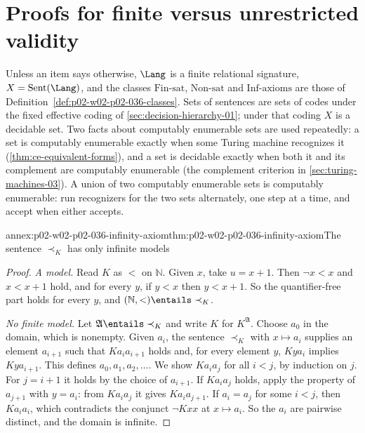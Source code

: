 \section{Proofs for finite versus unrestricted validity}
\label{sec:annex-p02-w02-p02-036-finite-validity}

Unless an item says otherwise, \(\Lang\) is a finite relational signature,
\(X=\operatorname{Sent}(\Lang)\), and the classes
\(\mathrm{Fin\text{-}sat}\), \(\mathrm{Non\text{-}sat}\) and
\(\mathrm{Inf\text{-}axioms}\) are those of
Definition~\ref{def:p02-w02-p02-036-classes}.  Sets of sentences are sets of
codes under the fixed effective coding of \cref{sec:decision-hierarchy-01};
under that coding \(X\) is a decidable set.  Two facts about computably
enumerable sets are used repeatedly: a set is computably enumerable exactly
when some Turing machine recognizes it (\cref{thm:ce-equivalent-forms}), and a
set is decidable exactly when both it and its complement are computably
enumerable (the complement criterion in \cref{sec:turing-machines-03}).  A
union of two computably enumerable sets is computably enumerable: run
recognizers for the two sets alternately, one step at a time, and accept when
either accepts.

\begin{annexitem}{annex:p02-w02-p02-036-infinity-axiom}{thm:p02-w02-p02-036-infinity-axiom}{The sentence \(\prec_K\) has only infinite models}
\begin{proof}
\emph{A model.}  Read \(K\) as \(<\) on \(\mathbb N\).  Given \(x\), take
\(u=x+1\).  Then \(\neg x<x\) and \(x<x+1\) hold, and for every \(y\), if
\(y<x\) then \(y<x+1\).  So the quantifier-free part holds for every \(y\),
and \((\mathbb N,<)\entails\prec_K\).

\emph{No finite model.}  Let \(\mathfrak A\entails\prec_K\) and write \(K\) for
\(K^{\mathfrak A}\).  Choose \(a_0\) in the domain, which is nonempty.  Given
\(a_i\), the sentence \(\prec_K\) with \(x\mapsto a_i\) supplies an element
\(a_{i+1}\) such that \(Ka_ia_{i+1}\) holds and, for every element \(y\),
\(Kya_i\) implies \(Kya_{i+1}\).  This defines \(a_0,a_1,a_2,\ldots\).  We show
\(Ka_ia_j\) for all \(i<j\), by induction on \(j\).  For \(j=i+1\) it holds by
the choice of \(a_{i+1}\).  If \(Ka_ia_j\) holds, apply the property of
\(a_{j+1}\) with \(y=a_i\): from \(Ka_ia_j\) it gives \(Ka_ia_{j+1}\).  If
\(a_i=a_j\) for some \(i<j\), then \(Ka_ia_i\), which contradicts the conjunct
\(\neg Kxx\) at \(x\mapsto a_i\).  So the \(a_i\) are pairwise distinct, and
the domain is infinite.
\end{proof}
\end{annexitem}

